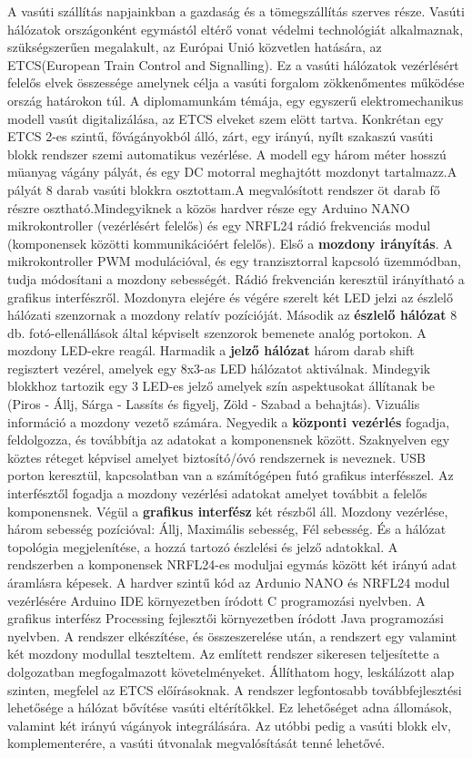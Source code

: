 \documentclass[a4paper,12pt]{article}
\begin{document}
A vasúti szállítás napjainkban a gazdaság és a tömegszállítás szerves része. Vasúti hálózatok országonként egymástól eltérő vonat védelmi technológiát alkalmaznak, szükségszerűen megalakult, az Európai Unió közvetlen hatására, az ETCS(European Train Control and Signalling). Ez a vasúti hálózatok vezérlésért felelős elvek összessége amelynek célja a vasúti forgalom zökkenőmentes működése ország határokon túl. A diplomamunkám témája, egy egyszerű elektromechanikus modell vasút digitalizálása, az ETCS elveket szem elött tartva. Konkrétan egy ETCS 2-es szintű, fővágányokból álló, zárt, egy irányú, nyílt szakaszú vasúti blokk rendszer szemi automatikus vezérlése. A modell egy három méter hosszú müanyag vágány pályát, és egy DC motorral meghajtótt mozdonyt tartalmazz.A pályát 8 darab vasúti blokkra osztottam.A megvalósított rendszer öt darab fő részre osztható.Mindegyiknek a közös hardver része egy Arduino NANO mikrokontroller (vezérlésért felelős) és egy NRFL24 rádió frekvenciás modul (komponensek közötti kommunikációért felelős). Első a \textbf{mozdony irányítás}. A mikrokontroller PWM modulációval, és egy tranzisztorral kapcsoló üzemmódban, tudja módosítani a mozdony sebességét. Rádió frekvencián keresztül irányítható a grafikus interfészről. Mozdonyra elejére és végére szerelt két LED jelzi az észlelő hálózati szenzornak a mozdony relatív pozícióját. Második az \textbf{ észlelő hálózat} 8 db. fotó-ellenállások által képviselt szenzorok bemenete analóg portokon. A mozdony LED-ekre reagál. Harmadik a \textbf{jelző hálózat} három darab shift regisztert vezérel, amelyek egy 8x3-as LED hálózatot aktiválnak. Mindegyik blokkhoz tartozik egy 3 LED-es jelző amelyek szín aspektusokat állítanak be (Piros - Állj, Sárga - Lassíts és figyelj, Zöld - Szabad a behajtás). Vizuális információ a mozdony vezető számára. Negyedik a \textbf{központi vezérlés} fogadja, feldolgozza, és továbbítja az adatokat a komponensnek között. Szaknyelven egy köztes réteget képvisel amelyet biztosító/óvó rendszernek is neveznek. USB porton keresztül, kapcsolatban van a számítógépen futó grafikus interfésszel. Az interfésztől fogadja a mozdony vezérlési adatokat amelyet továbbit a felelős komponensnek. Végül a \textbf{grafikus interfész} két részből áll. Mozdony vezérlése, három sebesség pozícióval: Állj, Maximális sebesség, Fél sebesség. És a hálózat topológia megjelenítése, a hozzá tartozó észlelési és jelző adatokkal. A rendszerben a komponensek NRFL24-es moduljai egymás között két irányú adat áramlásra képesek. A hardver szintű kód az Ardunio NANO és NRFL24 modul vezérlésére Arduino IDE környezetben íródott C programozási nyelvben. A grafikus interfész Processing fejlesztői környezetben íródott Java programozási nyelvben. A rendszer elkészítése, és összeszerelése után, a rendszert egy valamint két mozdony modullal teszteltem. Az említett rendszer sikeresen teljesítette a dolgozatban megfogalmazott követelményeket. Állíthatom hogy, leskálázott alap szinten, megfelel az ETCS előírásoknak. A rendszer legfontosabb továbbfejlesztési lehetősége a hálózat bővítése vasúti eltérítőkkel. Ez lehetőséget adna állomások, valamint két irányú vágányok integrálására. Az utóbbi pedig a vasúti blokk elv, komplementerére, a vasúti útvonalak megvalósítását tenné lehetővé.
\end{document}
